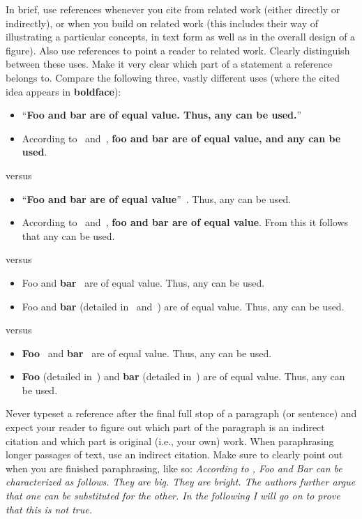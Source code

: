 \documentclass[]{ccs-thesis}
\begin{document}
In brief, use references whenever you cite from related work (either directly or indirectly), or when you build on related work (this includes their way of illustrating a particular concepts, in text form as well as in the overall design of a figure).
Also use references to point a reader to related work.
Clearly distinguish between these uses.
Make it very clear which part of a statement a reference belongs to.
Compare the following three, vastly different uses (where the cited idea appears in \textbf{boldface}):

\begin{itemize}
\item ``\textbf{Foo and bar are of equal value. Thus, any can be used.}''~\cite{akyildiz2002survey,arampatzis2005survey}
\item According to~\cite{akyildiz2002survey} and~\cite{arampatzis2005survey}, \textbf{foo and bar are of equal value, and any can be used}.
\end{itemize}
versus
\begin{itemize}
\item ``\textbf{Foo and bar are of equal value}''~\cite{akyildiz2002survey,arampatzis2005survey}. Thus, any can be used.
\item According to~\cite{akyildiz2002survey} and~\cite{arampatzis2005survey}, \textbf{foo and bar are of equal value}. From this it follows that any can be used.
\end{itemize}
versus
\begin{itemize}
\item Foo and \textbf{bar}~\cite{akyildiz2002survey,arampatzis2005survey} are of equal value. Thus, any can be used.
\item Foo and \textbf{bar} (detailed in~\cite{akyildiz2002survey} and~\cite{arampatzis2005survey}) are of equal value. Thus, any can be used.
\end{itemize}
versus
\begin{itemize}
\item \textbf{Foo}~\cite{akyildiz2002survey} and \textbf{bar}~\cite{arampatzis2005survey} are of equal value. Thus, any can be used.
\item \textbf{Foo} (detailed in~\cite{akyildiz2002survey}) and \textbf{bar} (detailed in~\cite{arampatzis2005survey}) are of equal value. Thus, any can be used.
\end{itemize}

Never typeset a reference after the final full stop of a paragraph (or sentence) and expect your reader to figure out which part of the paragraph is an indirect citation and which part is original (i.e., your own) work.
When paraphrasing longer passages of text, use an indirect citation.
Make sure to clearly point out when you are finished paraphrasing, like so:
\emph{According to \textcite{akyildiz2002survey}, Foo and Bar can be characterized as follows. They are big. They are bright. The authors further argue that one can be substituted for the other. In the following I will go on to prove that this is not true.}
\end{document}
